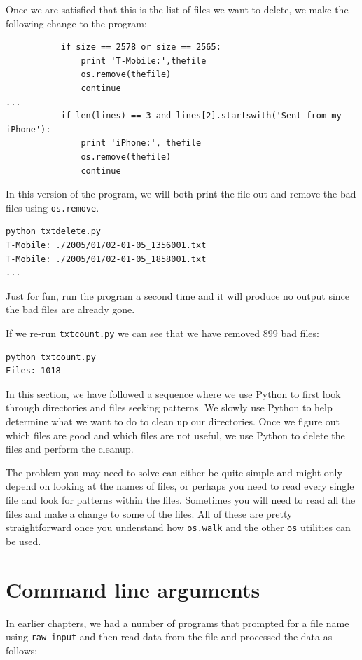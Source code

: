 \documentclass[11pt]{book}
\begin{document}
Once we are satisfied that this is the list of files we want to delete,
we make the following change to the program:

\beforeverb
\begin{verbatim}
           if size == 2578 or size == 2565:
               print 'T-Mobile:',thefile
               os.remove(thefile)
               continue
...
           if len(lines) == 3 and lines[2].startswith('Sent from my iPhone'):
               print 'iPhone:', thefile
               os.remove(thefile)
               continue
\end{verbatim}
\afterverb
%
In this version of the program, we will both print the file out 
and remove the bad files
using {\tt os.remove}.

\beforeverb
\begin{verbatim}
python txtdelete.py 
T-Mobile: ./2005/01/02-01-05_1356001.txt
T-Mobile: ./2005/01/02-01-05_1858001.txt
...
\end{verbatim}
\afterverb
%
Just for fun, run the program a second time and it will produce no output
since the bad files are already gone.

If we re-run {\tt txtcount.py} we can see that we have removed
899 bad files:
\beforeverb
\begin{verbatim}
python txtcount.py 
Files: 1018
\end{verbatim}
\afterverb
%
In this section, we have followed a sequence where we use Python 
to first look through directories and files seeking
patterns.  We slowly use Python to help determine what we 
want to do to clean up our directories.  Once we
figure out which files are good and which files are 
not useful, we use Python to delete the files and 
perform the cleanup.

The problem you may need to solve can either be quite simple 
and might only depend on looking at the names of files,
or perhaps you need to read every single file and
look for patterns within the files.  Sometimes 
you will need to read all the files and make a change 
to some of the files.  All of these are pretty 
straightforward once you understand how {\tt os.walk}
and the other {\tt os} utilities can be used.

\section{Command line arguments}


In earlier chapters, we had a number of programs that prompted
for a file name using \verb"raw_input" and then read data 
from the file and processed the data as follows:
\end{document}
